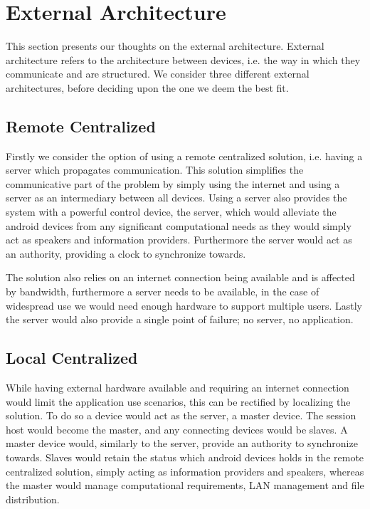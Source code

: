 \section{External Architecture}
This section presents our thoughts on the external architecture.
External architecture refers to the architecture between devices, i.e. the way in which they communicate and are structured.
We consider three different external architectures, before deciding upon the one we deem the best fit.

\subsection{Remote Centralized}
Firstly we consider the option of using a remote centralized solution, i.e. having a server which propagates communication.
This solution simplifies the communicative part of the problem by simply using the internet and using a server as an intermediary between all devices.
Using a server also provides the system with a powerful control device, the server, which would alleviate the android devices from any significant computational needs as they would simply act as speakers and information providers.
Furthermore the server would act as an authority, providing a clock to synchronize towards.

The solution also relies on an internet connection being available and is affected by bandwidth, furthermore a server needs to be available, in the case of widespread use we would need enough hardware to support multiple users. 
Lastly the server would also provide a single point of failure; no server, no application.


\subsection{Local Centralized}
While having external hardware available and requiring an internet connection would limit the application use scenarios, this can be rectified by localizing the solution.
To do so a device would act as the server, a master device.
The session host would become the master, and any connecting devices would be slaves.
A master device would, similarly to the server, provide an authority to synchronize towards.
Slaves would retain the status which android devices holds in the remote centralized solution, simply acting as information providers and speakers, whereas the master would manage computational requirements, LAN management and file distribution.

